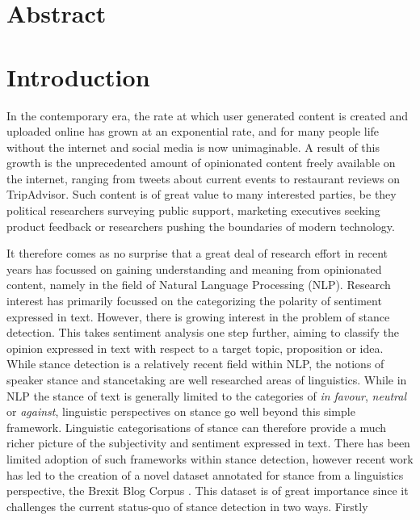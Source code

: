 \documentclass[Dissertation.tex]{subfiles}
\begin{document}
\chapter*{Abstract}


\chapter{Introduction}

In the contemporary era, the rate at which user generated content is created and uploaded online has grown at an exponential rate, and for many people life without the internet and social media is now unimaginable. A result of this growth is the unprecedented amount of opinionated content freely available on the internet, ranging from tweets about current events to restaurant reviews on TripAdvisor. Such content is of great value to many interested parties, be they political researchers surveying public support, marketing executives seeking product feedback or researchers pushing the boundaries of modern technology.

It therefore comes as no surprise that a great deal of research effort in recent years has focussed on gaining understanding and meaning from opinionated content, namely in the field of Natural Language Processing (NLP). Research interest has primarily focussed on the categorizing the polarity of sentiment expressed in text. However, there is growing interest in the problem of stance detection. This takes sentiment analysis one step further, aiming to classify the opinion expressed in text with respect to a target topic, proposition or idea. While stance detection is a relatively recent field within NLP, the notions of speaker stance and stancetaking are well researched areas of linguistics. While in NLP the stance of text is generally limited to the categories of \textit{in favour}, \textit{neutral} or \textit{against}, linguistic perspectives on stance go well beyond this simple framework. Linguistic categorisations of stance can therefore provide a much richer picture of the subjectivity and sentiment expressed in text. There has been limited adoption of such frameworks within stance detection, however recent work has led to the creation of a novel dataset annotated for stance from a linguistics perspective, the Brexit Blog Corpus \cite{simakiAnnotatingSpeakerStance2017}. This dataset is of great importance since it challenges the current status-quo of stance detection in two ways. Firstly
\end{document}
